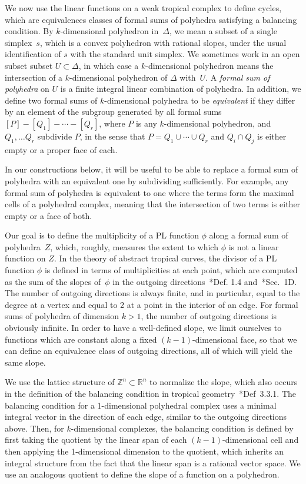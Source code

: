 \documentclass[11pt,reqno]{amsart}
\theoremstyle{definition}
\newcommand{\defi}[1]{\emph{#1}}
\newcommand{\RR}{\mathbb R}
\newcommand{\ZZ}{\mathbb Z}
\begin{document}
We now use the linear functions on a weak tropical complex to define cycles,
which are equivalences classes of formal sums of polyhedra satisfying a
balancing condition. By $k$-dimensional polyhedron in~$\Delta$, we mean a subset
of a single simplex~$s$, which is a convex polyhedron with rational slopes,
under the usual identification of $s$ with the standard unit simplex. We
sometimes work in an open subset
subset $U \subset \Delta$, in which case a $k$-dimensional polyhedron means the intersection
of a $k$-dimensional polyhedron of $\Delta$ with~$U$. A \defi{formal sum of
polyhedra} on $U$ is a finite integral linear combination of polyhedra. In
addition, we define two formal sums of $k$-dimensional polyhedra to be
\defi{equivalent} if they differ by an element of the subgroup generated by all formal
sums $[P] - [Q_1] - \cdots - [Q_r]$, where $P$ is any $k$-dimensional
polyhedron, and $Q_1, \ldots Q_r$ subdivide $P$, in the sense that $P
= Q_1 \cup \cdots \cup Q_r$ and $Q_i \cap Q_j$ is either empty or a proper face
of each.

In our constructions below, it will be useful to be able to replace a formal sum
of polyhedra with an equivalent one by subdividing sufficiently. For example,
any formal sum of polyhedra is equivalent to one where the terms form the
maximal cells of a polyhedral complex, meaning that the intersection of two
terms is either empty or a face of both.

Our goal is to define the multiplicity of a PL function $\phi$ along a formal
sum of polyhedra~$Z$, which, roughly, measures the extent to which $\phi$ is not
a linear function on $Z$. In the theory of abstract tropical curves, the divisor
of a PL function $\phi$ is defined in terms of multiplicities at each point,
which are computed as the sum of the slopes of~$\phi$ in the outgoing
directions~\cite{gathmann-kerber}*{Def. 1.4} and~\cite{baker}*{Sec.~1D}. The
number of outgoing directions is always finite, and in particular, equal to the
degree at a vertex and equal to 2 at a point in the interior of an edge. For
formal sums of polyhedra of dimension $k > 1$, the number of outgoing directions
is obviously infinite. In order to have a well-defined slope, we
limit ourselves to functions which are constant along a fixed
$(k-1)$-dimensional face, so that we can define an equivalence class of outgoing
directions, all of which will yield the same slope.

We use the lattice structure of $\ZZ^n \subset \RR^n$ to normalize the slope,
which also occurs in the
definition of the balancing condition in tropical
geometry~\cite{maclagan-sturmfels}*{Def~3.3.1}. The balancing
condition for a 1-dimensional polyhedral complex uses a minimal integral vector
in the direction of each edge, similar to the outgoing directions above. Then,
for $k$-dimensional complexes, the balancing condition is defined by first
taking the quotient by the linear span of each $(k-1)$-dimensional cell and then
applying the 1-dimensional dimension to the quotient, which inherits an integral
structure from the fact that the linear span is a rational vector
space. We use an analogous quotient to
define the slope of a function on a polyhedron.
\end{document}
